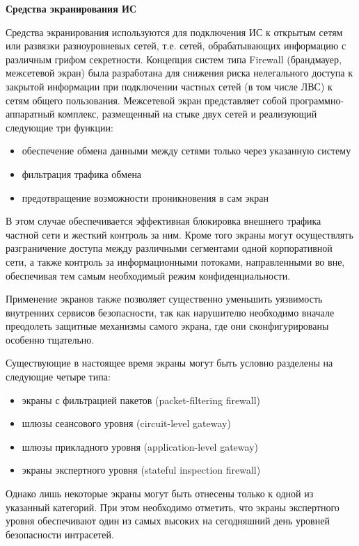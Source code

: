 \bigbreak
\textbf{Средства экранирования ИС}

Средства экранирования используются для подключения ИС к открытым сетям или развязки разноуровневых сетей, т.е. сетей, обрабатывающих информацию с различным грифом секретности. Концепция систем типа Firewall (брандмауер, межсетевой экран) была разработана для снижения риска нелегального доступа к закрытой информации при подключении частных сетей (в том числе ЛВС) к сетям общего пользования. Межсетевой экран представляет собой программно-аппаратный комплекс, размещенный на стыке двух сетей и реализующий следующие три функции:
\begin{itemize}
    \item обеспечение обмена данными между сетями только через указанную систему
    \item фильтрация трафика обмена
    \item предотвращение возможности проникновения в сам экран
\end{itemize}

В этом случае обеспечивается эффективная блокировка внешнего трафика частной сети и жесткий контроль за ним. Кроме того экраны могут осуществлять разграничение доступа между различными сегментами одной корпоративной сети, а также контроль за информационными потоками, направленными во вне, обеспечивая тем самым необходимый режим конфиденциальности.

Применение экранов также позволяет существенно уменьшить уязвимость внутренних сервисов безопасности, так как нарушителю необходимо вначале преодолеть защитные механизмы самого экрана, где они сконфигурированы особенно тщательно.

Существующие в настоящее время экраны могут быть условно разделены на следующие четыре типа:
\begin{itemize}
    \item экраны с фильтрацией пакетов (packet-filtering firewall)
    \item шлюзы сеансового уровня (circuit-level gateway)
    \item шлюзы прикладного уровня (application-level gateway)
    \item экраны экспертного уровня (stateful inspection firewall)
\end{itemize}

Однако лишь некоторые экраны могут быть отнесены только к одной из указанный категорий. При этом необходимо отметить, что экраны экспертного уровня обеспечивают один из самых высоких на сегодняшний день уровней безопасности интрасетей.

